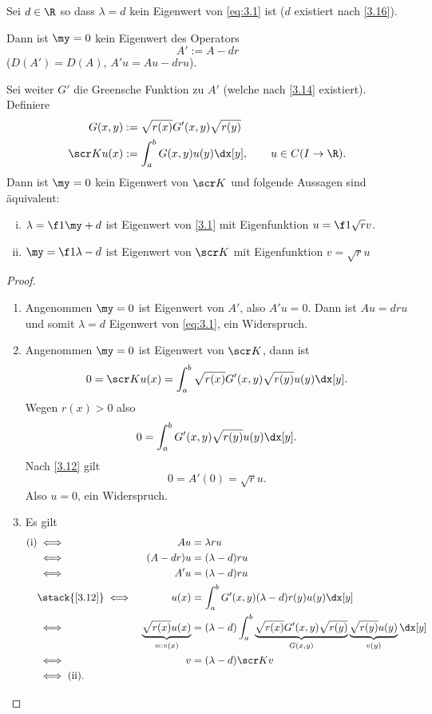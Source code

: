 \begin{st} \label{3.17}
	Sei $d\in \R$ so dass $\lambda = d$ kein Eigenwert von \eqref{eq:3.1} ist ($d$ existiert nach \ref{3.16}).

	Dann ist $\my = 0$ kein Eigenwert des Operators
	\[
		A' := A - dr
	\]
	($D(A') = D(A)$, $A'u = Au - dru$).

	Sei weiter $G'$ die Greensche Funktion zu $A'$ (welche nach \ref{3.14} existiert).
	Definiere
	\begin{align*}
		G(x,y) &:= \sqrt {r(x)} G'(x,y) \sqrt{r(y)} \\
		\scr K u(x) &:= \int_a^b G(x,y) u(y) \dx[y],  \qquad \text{$u\in C(I\to \R)$}.
	\end{align*}
	Dann ist $\my = 0$ kein Eigenwert von $\scr K$ und folgende Aussagen sind äquivalent:
	\begin{enumerate}[(i)]
		\item
			$\lambda = \f 1\my + d$ ist Eigenwert von \eqref{3.1} mit Eigenfunktion $u=\f 1{\sqrt r} v$.
		\item
			$\my = \f 1{\lambda -d}$ ist Eigenwert von $\scr K$ mit Eigenfunktion $v = \sqrt{r} u$
	\end{enumerate}
	\begin{proof}
		\begin{enumerate}[1)]
			\item
				Angenommen $\my = 0$ ist Eigenwert von $A'$, also $A'u = 0$.
				Dann ist $Au = dru$ und somit $\lambda = d$ Eigenwert von \eqref{eq:3.1}, ein Widerspruch.
			\item
				Angenommen $\my = 0$ ist Eigenwert von $\scr K$, dann ist
				\begin{align*}
					0 = \scr K u(x) = \int_a^b \sqrt{r(x)} G'(x,y) \sqrt{r(y)} u(y) \dx[y].
				\end{align*}
				Wegen $r(x) > 0$ also
				\begin{align*}
					0 = \int_a^b G'(x,y) \sqrt{r(y)} u(y) \dx[y].
				\end{align*}
				Nach \ref{3.12} gilt 
				\[
					0 = A'(0) = \sqrt{r} u. 
				\]
				Also $u = 0$, ein Widerspruch.
			\item
				Es gilt
				\begin{alignat*}{2}
					\text{(i)} &\iff& Au &= \lambda ru \\
					&\iff& (A-dr)u &= (\lambda - d)ru \\
					&\iff& A' u &= (\lambda -d)ru \\ 
					&\stack{\ref{3.12}}\iff& u(x) &= \int_a^b G'(x,y) (\lambda -d) r(y) u(y) \dx[y] \\
					&\iff& \underbrace{\sqrt{r(x)} u(x)}_{=:v(x)} &= (\lambda - d) \int_a^b \underbrace{\sqrt{r(x)} G'(x,y) \sqrt{r(y)}}_{G(x,y)} \underbrace{\sqrt{r(y)} u(y)}_{v(y)} \dx[y] \\
					&\iff& v &= (\lambda -d) \scr K v \\
					&\iff \text{(ii).}&&
				\end{alignat*}
		\end{enumerate}
	\end{proof}
\end{st}

